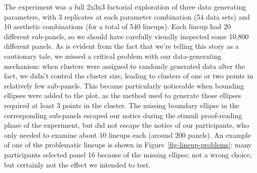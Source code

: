 \documentclass[
  10pt,
  letterpaper,
  DIV=11,
  numbers=noendperiod]{scrartcl}
\begin{document}
The experiment was a full 2x3x3 factorial exploration of three data
generating parameters, with 3 replicates at each parameter combination
(54 data sets) and 10 aesthetic combinations (for a total of 540
lineups). Each lineup had 20 different sub-panels, so we should have
carefully visually inspected some 10,800 different panels. As is evident
from the fact that we're telling this story as a cautionary tale, we
missed a critical problem with our data-generating mechanism: when
clusters were assigned to randomly generated data after the fact, we
didn't control the cluster size, leading to clusters of one or two
points in relatively few sub-panels. This became particularly noticeable
when bounding ellipses were added to the plot, as the method used to
generate those ellipses required at least 3 points in the cluster. The
missing boundary ellipse in the corresponding sub-panels escaped our
notice during the stimuli proof-reading phase of the experiment, but did
not escape the notice of our participants, who only needed to examine
about 10 lineups each (around 200 panels). An example of one of the
problematic lineups is shown in Figure~\ref{fig-lineup-problems}: many
participants selected panel 16 because of the missing ellipse; not a
wrong choice, but certainly not the effect we intended to test.
\end{document}

